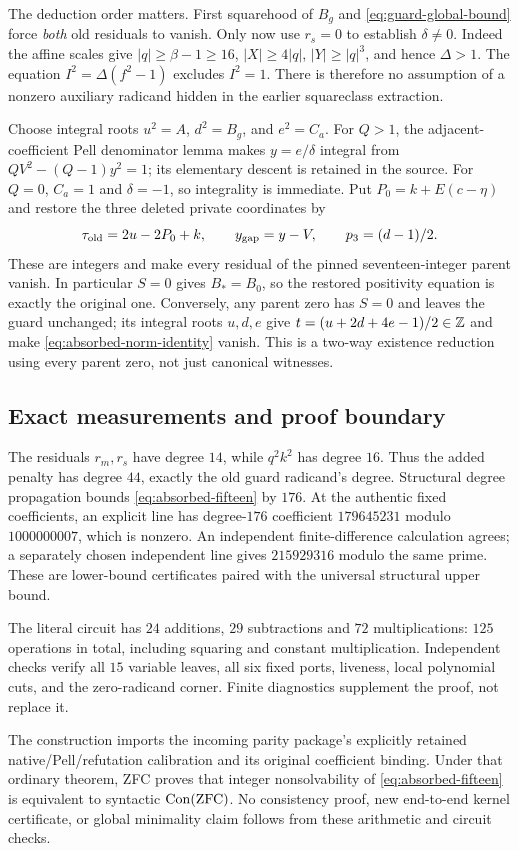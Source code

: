 The deduction order matters. First squarehood of $B_g$ and
\eqref{eq:guard-global-bound} force \emph{both} old residuals to vanish.
Only now use $r_s=0$ to establish $\delta\neq0$.
Indeed the affine scales give $|q|\geq\beta-1\geq16$,
$|X|\geq4|q|$, $|Y|\geq|q|^3$, and hence $\Delta>1$.
The equation $I^2=\Delta(f^2-1)$ excludes $I^2=1$.
There is therefore no assumption of a nonzero auxiliary radicand hidden
in the earlier squareclass extraction.

Choose integral roots $u^2=A$, $d^2=B_g$, and $e^2=C_a$.
For $Q>1$, the adjacent-coefficient Pell denominator lemma makes
$y=e/\delta$ integral from
$QV^2-(Q-1)y^2=1$; its elementary descent is retained in the source.
For $Q=0$, $C_a=1$ and $\delta=-1$, so integrality is immediate.
Put $P_0=k+E(c-\eta)$ and restore the three deleted private coordinates by
\[
 \tau_{\rm old}=2u-2P_0+k,\qquad
 y_{\rm gap}=y-V,\qquad
 p_3=(d-1)/2.
\]
These are integers and make every residual of the pinned
seventeen-integer parent vanish. In particular $S=0$ gives $B_*=B_0$,
so the restored positivity equation is exactly the original one.
Conversely, any parent zero has $S=0$ and leaves the guard unchanged;
its integral roots $u,d,e$ give
$t=(u+2d+4e-1)/2\in\mathbb Z$ and make
\eqref{eq:absorbed-norm-identity} vanish. This is a two-way existence
reduction using every parent zero, not just canonical witnesses.

\subsection{Exact measurements and proof boundary}
The residuals $r_m,r_s$ have degree $14$, while $q^2k^2$ has degree
$16$. Thus the added penalty has degree $44$, exactly the old guard
radicand's degree. Structural degree propagation bounds
\eqref{eq:absorbed-fifteen} by $176$. At the authentic fixed coefficients,
an explicit line has degree-$176$ coefficient
$179645231$ modulo $1000000007$, which is nonzero. An independent
finite-difference calculation agrees; a separately chosen independent
line gives $215929316$ modulo the same prime. These are lower-bound
certificates paired with the universal structural upper bound.

The literal circuit has $24$ additions, $29$ subtractions and $72$
multiplications: $125$ operations in total, including squaring and
constant multiplication. Independent checks verify all $15$ variable
leaves, all six fixed ports, liveness, local polynomial cuts, and the
zero-radicand corner. Finite diagnostics supplement the proof, not replace it.

The construction imports the incoming parity package's explicitly retained
native/Pell/refutation calibration and its original coefficient binding.
Under that ordinary theorem, ZFC proves that integer nonsolvability of
\eqref{eq:absorbed-fifteen} is equivalent to syntactic $\operatorname{Con}(\mathrm{ZFC})$.
No consistency proof, new end-to-end kernel certificate, or global
minimality claim follows from these arithmetic and circuit checks.
